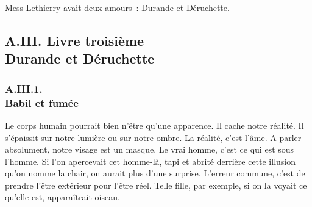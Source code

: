 \documentclass[french,twoside]{book} %
\begin{document}
Mess Lethierry avait deux amours : Durande et Déruchette.\par
  \subsection[{A.III. Livre troisième. Durande et Déruchette}]{A.III. Livre troisième \\
Durande et Déruchette}
  \subsubsection[{A.III.1. Babil et fumée}]{A.III.1. \\
Babil et fumée}
\noindent Le corps humain pourrait bien n’être qu’une apparence. Il cache notre réalité. Il s’épaissit sur notre lumière ou sur notre ombre. La réalité, c’est l’âme. A parler absolument, notre visage est un masque. Le vrai homme, c’est ce qui est sous l’homme. Si l’on apercevait cet homme-là, tapi et abrité derrière cette illusion qu’on nomme la chair, on aurait plus d’une surprise. L’erreur commune, c’est de prendre l’être extérieur pour l’être réel. Telle fille, par exemple, si on la voyait ce qu’elle est, apparaîtrait oiseau.\par
\end{document}
